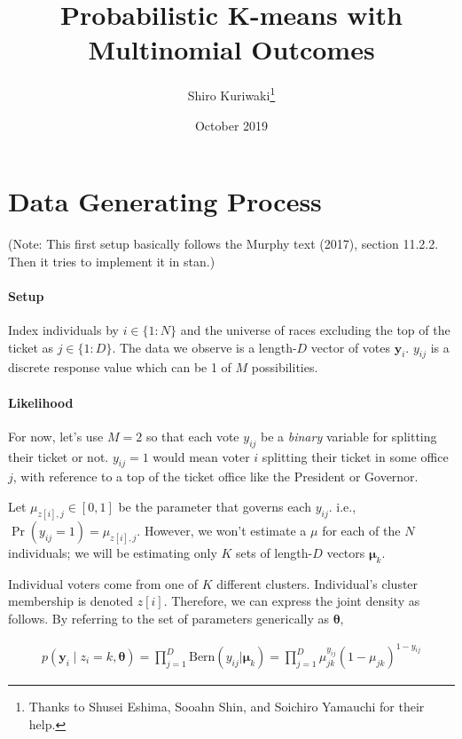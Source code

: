 \documentclass[12pt,letterpaper]{article}
\title{ \Large\textbf{Probabilistic K-means with Multinomial Outcomes}}
\author{\normalsize  Shiro
Kuriwaki\thanks{Thanks to Shusei Eshima, Sooahn Shin, and Soichiro Yamauchi for their help.} }
\date{\normalsize October 2019}
\newcommand{\bth}{\bm{\theta}}
\newcommand{\bmu}{\bm{\mu}}
\newcommand{\by}{\mathbf{y}}
\begin{document}
\maketitle



\section{Data Generating Process}

(Note: This first setup basically follows the Murphy text (2017),
section 11.2.2. Then it tries to implement it in stan.)

\paragraph{Setup}

Index individuals by \(i \in \{1:N\}\) and the universe of races
excluding the top of the ticket as \(j \in \{1:D\}\). The data we
observe is a length-\(D\) vector of votes \(\by_i\). \(y_{ij}\) is a
discrete response value which can be 1 of \(M\) possibilities.

\paragraph{Likelihood}

For now, let's use \(M = 2\) so that each vote \(y_{ij}\) be a
\emph{binary} variable for splitting their ticket or not. \(y_{ij} = 1\)
would mean voter \(i\) splitting their ticket in some office \(j\), with
reference to a top of the ticket office like the President or Governor.

Let \(\mu_{z[i], j} \in [0, 1]\) be the parameter that governs each
\(y_{ij}\). i.e., \(\Pr(y_{ij} = 1) = \mu_{z[i], j}.\) However, we won't
estimate a \(\mu\) for each of the \(N\) individuals; we will be
estimating only \(K\) sets of length-\(D\) vectors \(\bmu_{k}\).

Individual voters come from one of \(K\) different clusters.
Individual's cluster membership is denoted \(z[i]\). Therefore, we can
express the joint density as follows. By referring to the set of
parameters generically as \(\bth\),

\begin{align}
p(\by_{i} \mid z_{i} = k, \bth) = \prod^{D}_{j = 1} \text{Bern}(y_{ij} | \bmu_k) = \prod^{D}_{j = 1} \mu_{jk}^{y_{ij}}(1 - \mu_{jk})^{1 - y_{ij}}
\end{align}
\end{document}
